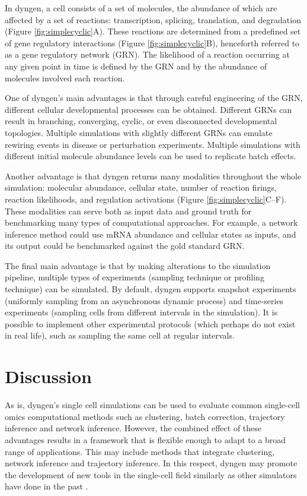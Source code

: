 In dyngen, a cell consists of a set of molecules, the abundance of which are affected by a set of reactions: transcription, splicing, translation, and degradation (Figure \ref{fig:simplecyclic}A). These reactions are determined from a predefined set of gene regulatory interactions (Figure \ref{fig:simplecyclic}B), henceforth referred to as a gene regulatory network (GRN). The likelihood of a reaction occurring at any given point in time is defined by the GRN and by the abundance of molecules involved each reaction.

One of dyngen's main advantages is that through careful engineering of the GRN, different cellular developmental processes can be obtained. Different GRNs can result in branching, converging, cyclic, or even disconnected developmental topologies. Multiple simulations with slightly different GRNs can emulate rewiring events in disease or perturbation experiments. %
Multiple simulations with different initial molecule abundance levels can be used to replicate batch effects. 

Another advantage is that dyngen returns many modalities throughout the whole simulation: molecular abundance, cellular state, number of reaction firings, reaction likelihoods, and regulation activations (Figure \ref{fig:simplecyclic}C--F). These modalities can serve both as input data and ground truth for benchmarking many types of computational approaches. For example, a network inference method could use mRNA abundance and cellular states as inputs, and its output could be benchmarked against the gold standard GRN.

The final main advantage is that by making alterations to the simulation pipeline, multiple types of experiments (sampling technique or profiling technique) can be simulated. By default, dyngen supports snapshot experiments (uniformly sampling from an asynchronous dynamic process) and time-series experiments (sampling cells from different intervals in the simulation). 
It is possible to implement other experimental protocols (which perhaps do not exist in real life), such as sampling the same cell at regular intervals. 



\section{Discussion}
As is, dyngen's single cell simulations can be used to evaluate common single-cell omics computational methods such as clustering, batch correction, trajectory inference and network inference.
However, the combined effect of these advantages results in a framework that is flexible enough to adapt to a broad range of applications. This may include methods that integrate clustering, network inference and trajectory inference. In this respect, dyngen may promote the development of new tools in the single-cell field similarly as other simulators have done in the past \cite{schaffter_genenetweaversilicobenchmark_2011,ewing_combiningtumorgenome_2015}.

